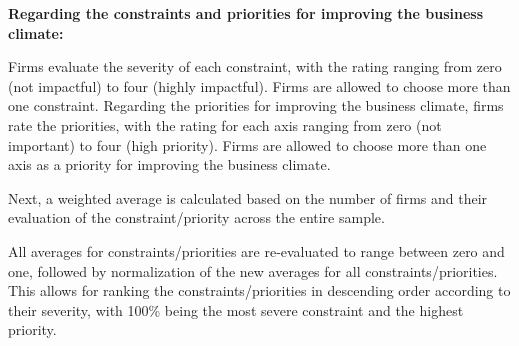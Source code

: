 \vspace{2em}

\noindent
{\fontsize{10}{13}\selectfont \textbf{Regarding the constraints and priorities for improving the business climate:}}

\vspace{0.8em}

\noindent
{\fontsize{10}{13}\selectfont
Firms evaluate the severity of each constraint, with the rating ranging from zero (not impactful) to four (highly impactful). Firms are allowed to choose more than one constraint. Regarding the priorities for improving the business climate, firms rate the priorities, with the rating for each axis ranging from zero (not important) to four (high priority). Firms are allowed to choose more than one axis as a priority for improving the business climate.

\vspace{0.8em}

Next, a weighted average is calculated based on the number of firms and their evaluation of the constraint/priority across the entire sample.

\vspace{0.8em}

All averages for constraints/priorities are re-evaluated to range between zero and one, followed by normalization of the new averages for all constraints/priorities. This allows for ranking the constraints/priorities in descending order according to their severity, with 100\% being the most severe constraint and the highest priority.
}

\clearpage
